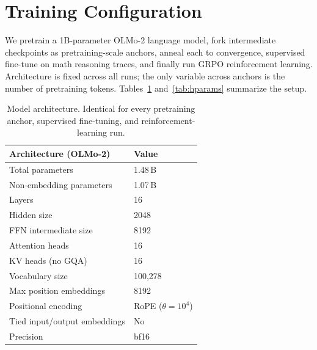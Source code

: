 
\section{Training Configuration}
\label{app:config}

We pretrain a 1B-parameter OLMo-2 language model, fork intermediate
checkpoints as pretraining-scale anchors, anneal each to convergence,
supervised fine-tune on math reasoning traces, and finally run GRPO
reinforcement learning. Architecture is fixed across all runs; the only
variable across anchors is the number of pretraining tokens.
Tables~\ref{tab:arch} and~\ref{tab:hparams} summarize the setup.

\begin{table}[t]
\centering
\small
\begin{tabular}{@{}ll@{}}
\toprule
\textbf{Architecture (OLMo-2)} & \textbf{Value} \\
\midrule
Total parameters            & 1.48\,B \\
Non-embedding parameters    & 1.07\,B \\
Layers                      & 16 \\
Hidden size                 & 2048 \\
FFN intermediate size       & 8192 \\
Attention heads             & 16 \\
KV heads (no GQA)           & 16 \\
Vocabulary size             & 100{,}278 \\
Max position embeddings     & 8192 \\
Positional encoding         & RoPE ($\theta=10^4$) \\
Tied input/output embeddings & No \\
Precision                   & bf16 \\
\bottomrule
\end{tabular}
\caption{Model architecture. Identical for every pretraining anchor,
supervised fine-tuning, and reinforcement-learning run.}
\label{tab:arch}
\end{table}

